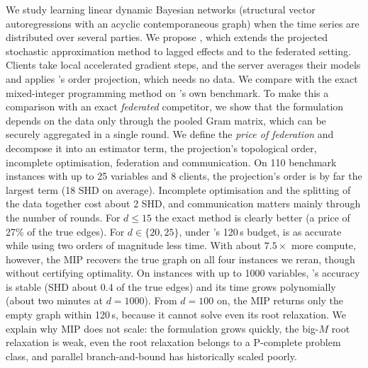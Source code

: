 We study learning linear dynamic Bayesian networks (structural vector autoregressions with an
acyclic contemporaneous graph) when the time series are distributed over several parties.
We propose \feddbn, which extends the projected stochastic approximation method \psidag{} to
lagged effects and to the federated setting. Clients take local accelerated gradient steps,
and the server averages their models and applies \psidag's order projection, which needs no
data. We compare \feddbn{} with the exact mixed-integer programming method \exdbn{} on
\exdbn's own benchmark. To make this a comparison with an exact \emph{federated} competitor,
we show that the \exdbn{} formulation depends on the data only through the pooled Gram
matrix, which can be securely aggregated in a single round. We define the \emph{price of
federation} and decompose it into an estimator term, the projection's topological order,
incomplete optimisation, federation and communication. On 110 benchmark instances with up
to 25 variables and 8 clients, the projection's order is by far the largest term (18 SHD on
average). Incomplete optimisation and the splitting of the data together cost about 2 SHD,
and communication matters mainly through the number of rounds. For $d\le15$ the exact method
is clearly better (a price of 27\% of the true edges). For $d\in\{20,25\}$, under \exdbn's
120\,s budget, \feddbn{} is as accurate while using two orders of magnitude less time.
With about $7.5\times$ more compute, however, the MIP recovers the true graph on all four
instances we reran, though without certifying optimality. On instances with up to 1000
variables, \feddbn's accuracy is stable (SHD about 0.4 of the true edges) and its time
grows polynomially (about two minutes at $d=1000$). From $d=100$ on, the MIP returns only the
empty graph within 120\,s, because it cannot solve even its root relaxation. We
explain why MIP does not scale: the formulation grows quickly, the big-$M$ root relaxation
is weak, even the root relaxation belongs to a P-complete problem class, and parallel
branch-and-bound has historically scaled poorly.

